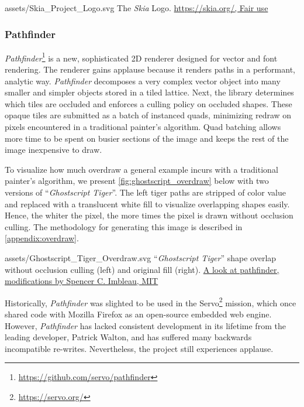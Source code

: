 \smallsvg
{assets/Skia_Project_Logo.svg}
{The \textit{Skia} Logo.}
{\href{https://skia.org}{https://skia.org/, Fair use}}

\subsubsection{Pathfinder}\label{sec:Pathfinder}

\textit{Pathfinder}\footnote{\href{https://github.com/servo/pathfinder}{https://github.com/servo/pathfinder}} is a new, sophisticated 2D renderer designed for vector and font rendering. The renderer gains applause because it renders paths in a performant, analytic way. \textit{Pathfinder} decomposes a very complex vector object into many smaller and simpler objects stored in a tiled lattice. Next, the library determines which tiles are occluded and enforces a culling policy on occluded shapes. These opaque tiles are submitted as a batch of instanced quads, minimizing redraw on pixels encountered in a traditional painter's algorithm. Quad batching allows more time to be spent on busier sections of the image and keeps the rest of the image inexpensive to draw\cite{Pathfinder_Features}.\medskip

To visualize how much overdraw a general example incurs with a traditional painter's algorithm, we present \cref{fig:ghostscript_overdraw} below with two versions of ``\textit{Ghostscript Tiger}''. The left tiger paths are stripped of color value and replaced with a translucent white fill to visualize overlapping shapes easily. Hence, the whiter the pixel, the more times the pixel is drawn without occlusion culling. The methodology for generating this image is described in \cref{appendix:overdraw}.

\widesvg
{assets/Ghostscript_Tiger_Overdraw.svg}
{``\textit{Ghostscript Tiger}'' shape overlap without occlusion culling (left) and original fill (right).\label{fig:ghostscript_overdraw}}
{\href{https://nical.github.io/posts/a-look-at-pathfinder.html}{A look at pathfinder, modifications by Spencer C. Imbleau, MIT}}
\medskip

Historically, \textit{Pathfinder} was slighted to be used in the Servo\footnote{\href{https://servo.org/}{https://servo.org/}} mission, which once shared code with Mozilla Firefox as an open-source embedded web engine. However, \textit{Pathfinder} has lacked consistent development in its lifetime from the leading developer, Patrick Walton, and has suffered many backwards incompatible re-writes. Nevertheless, the project still experiences applause\cite{Silva19}.

